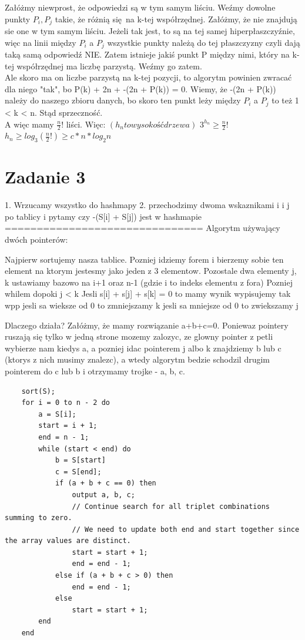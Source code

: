 \documentclass[12pt]{article}
\begin{document}
Załóżmy niewprost, że odpowiedzi są w tym samym liściu.
Weźmy dowolne punkty $P_i, P_j$ takie, że różnią się na k-tej współrzędnej. Załóżmy, że nie znajdują sie one w tym samym liściu. Jeżeli tak jest, to są na tej samej hiperpłaszczyźnie, więc na linii między $P_i$ a $P_j$ wszystkie punkty należą do tej płaszczyzny czyli dają taką samą odpowiedź NIE. Zatem istnieje jakiś punkt P między nimi, który na k-tej współrzędnej ma liczbę parzystą. Weźmy go zatem. \\

Ale skoro ma on liczbe parzystą na k-tej pozycji, to algorytm powinien zwracać dla niego "tak", bo P(k) + 2n + -(2n + P(k)) = 0. Wiemy, że -(2n + P(k)) należy do naszego zbioru danych, bo skoro ten punkt leży między $P_i$ a $P_j$ to też 1 < k < n. Stąd sprzeczność.\\

A więc mamy $\frac{n}{2}!$ liści. Więc: $(h_n to wysokość drzewa)$
$3^{h_n} \geq \frac{n}{2}!$
$h_n \geq log_3(\frac{n}{2}!) \geq c * n * log_2{n}$

\section{Zadanie 3}

1. Wrzucamy wszystko do hashmapy
2. przechodzimy dwoma wskaznikami i i j po tablicy i pytamy czy -(S[i] + S[j]) jest w hashmapie
===============================
Algorytm używający dwóch pointerów:

Najpierw sortujemy nasza tablice.
Pozniej idziemy forem i bierzemy sobie ten element na ktorym jestesmy jako jeden z 3 elementow.
Pozostale dwa elementy j, k ustawiamy bazowo na i+1 oraz n-1 (gdzie i to indeks elementu z fora)
Pozniej whilem dopoki j < k 
Jesli s[i] + s[j] + s[k] = 0 to mamy wynik wypisujemy tak
wpp jesli sa wieksze od 0 to zmniejszamy k 
jesli sa mniejsze od 0 to zwiekszamy j

Dlaczego działa?
Załóżmy, że mamy rozwiązanie a+b+c=0. Poniewaz pointery ruszają się tylko w jedną strone mozemy zalozyc, ze glowny pointer z petli wybierze nam kiedys a, a pozniej idac pointerem j albo k znajdziemy b lub c (ktorys z nich musimy znalezc), a wtedy algorytm bedzie schodzil drugim pointerem do c lub b i otrzymamy trojke - a, b, c.

\begin{lstlisting}
    sort(S);
    for i = 0 to n - 2 do
        a = S[i];
        start = i + 1;
        end = n - 1;
        while (start < end) do
            b = S[start]
            c = S[end];
            if (a + b + c == 0) then
                output a, b, c;
                // Continue search for all triplet combinations summing to zero.
                // We need to update both end and start together since the array values are distinct.
                start = start + 1;
                end = end - 1;
            else if (a + b + c > 0) then
                end = end - 1;
            else
                start = start + 1;
        end
    end
\end{lstlisting}
\end{document}
